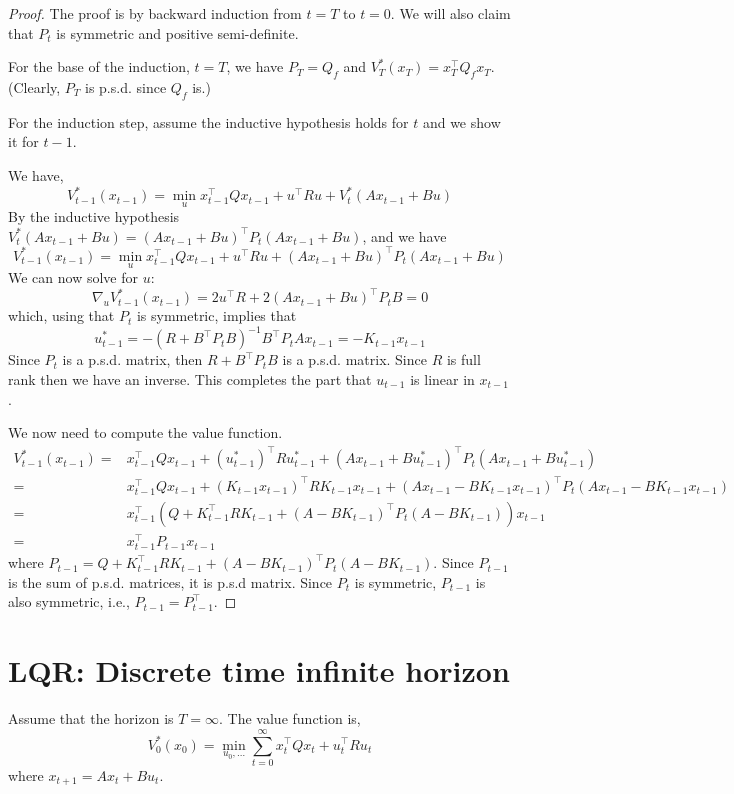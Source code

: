\begin{proof}
The proof is by backward induction from $t=T$ to $t=0$. We will also
claim that $P_t$ is symmetric and positive semi-definite.

For the base of the induction, $t=T$, we have $P_T=Q_f$ and
$V^*_T(x_T)=x_T^\top Q_f x_T$. (Clearly, $P_T$ is p.s.d. since $Q_f$
is.)

For the induction step, assume the inductive hypothesis holds for
$t$ and we show it for $t-1$.

We have,
\[
V^*_{t-1}(x_{t-1})=\min_u x_{t-1}^\top Qx_{t-1} +u^\top R u
+V^*_{t}(Ax_{t-1}+Bu)
\]
By the inductive hypothesis $V^*_{t}(Ax_{t-1}+Bu)=(Ax_{t-1}+Bu)^\top
P_t(Ax_{t-1}+Bu)$, and we have
\[
V^*_{t-1}(x_{t-1})=\min_u x_{t-1}^\top Qx_{t-1} +u^\top R u
+(Ax_{t-1}+Bu)^\top P_t(Ax_{t-1}+Bu)
\]
We can now solve for $u$:
\[
\nabla_u V_{t-1}^*(x_{t-1})=2u^\top R+2(Ax_{t-1}+Bu)^\top P_t B=0
\]
which, using that $P_t$ is symmetric, implies that
\[
u_{t-1}^*=-(R+B^\top P_tB)^{-1}B^\top P_t A x_{t-1}=-K_{t-1}x_{t-1}
\]
Since $P_t$ is a p.s.d. matrix,  then $R+B^\top P_t B$ is a p.s.d.
matrix. Since $R$ is full rank then we have an inverse.
%
This completes the
part that $u_{t-1}$ is linear in $x_{t-1}$.

We now need to compute the value function.
%
\begin{align*}
V^*_{t-1}(x_{t-1}) =& x_{t-1}^\top Qx_{t-1}+(u^*_{t-1})^\top
Ru^*_{t-1} +(Ax_{t-1}+Bu^*_{t-1})^\top P_t (Ax_{t-1}+Bu^*_{t-1})\\
=&x_{t-1}^\top Qx_{t-1}+(K_{t-1}x_{t-1})^\top
RK_{t-1}x_{t-1} +(Ax_{t-1}-BK_{t-1}x_{t-1})^\top P_t (Ax_{t-1}-BK_{t-1}x_{t-1})\\
=& x_{t-1}^\top \left(Q+K^\top_{t-1}RK_{t-1}+(A-BK_{t-1})^\top P_t
(A-BK_{t-1})\right)x_{t-1}\\
=& x_{t-1}^\top P_{t-1}x_{t-1}
\end{align*}
where $P_{t-1}=Q+K^\top_{t-1}RK_{t-1}+(A-BK_{t-1})^\top P_t
(A-BK_{t-1})$. Since $P_{t-1}$ is the sum of p.s.d. matrices, it is
p.s.d matrix. Since $P_t$ is symmetric, $P_{t-1}$ is also symmetric,
i.e., $P_{t-1}=P^\top_{t-1}$.
\end{proof}


\section{LQR: Discrete time infinite horizon}

Assume that the horizon is $T=\infty$. The value function is,
\[
V_0^*(x_0)=\min_{u_0,\ldots} \sum_{t=0}^\infty x_t^\top Q x_t
+u_t^\top R u_t
\]
where $x_{t+1}=Ax_t+Bu_t$.

